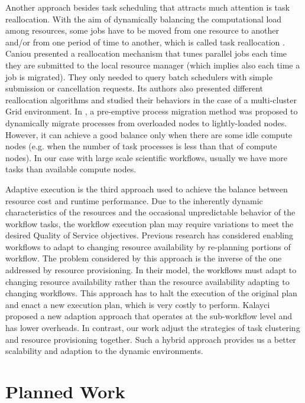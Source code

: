 Another approach besides task scheduling that attracts much attention is task reallocation. With the aim of dynamically balancing the computational load among resources, some jobs have to be moved from one resource to another and/or from one period of time to another, which is called task reallocation \cite{Tomas2012}. Caniou  \cite{Caniou2011} presented a reallocation mechanism that tunes parallel jobs each time they are submitted to the local resource manager (which implies also each time a job is migrated). They only needed to query batch schedulers with simple submission or cancellation requests.  Its authors also presented different reallocation algorithms and studied their behaviors in the case of a multi-cluster Grid environment. In \cite{Zhang2000}, a pre-emptive process migration method was proposed to dynamically migrate processes from overloaded nodes to lightly-loaded nodes. However, it can achieve a good balance only when there are some idle compute nodes (e.g. when the number of task processes is less than that of compute nodes). In our case with large scale scientific workflows, usually we have more tasks than available compute nodes. 

Adaptive execution is the third approach used to achieve the balance between resource cost and runtime performance. Due to the inherently dynamic characteristics of the resources and the occasional unpredictable behavior of the workflow tasks, the workflow execution plan may require variations to meet the desired Quality of Service objectives. Previous research \cite{Lee2008, Sakellariou2004, Yu2007} has considered enabling workflows to adapt to changing resource availability by re-planning portions of workflow. The problem considered by this approach is the inverse of the one addressed by resource provisioning. In their model, the workflows must adapt to changing resource availability rather than the resource availability adapting to changing workflows. This approach has to halt the execution of the original plan and enact a new execution plan, which is very costly to perform. Kalayci \cite{Kalayci2010} proposed a new adaption approach  that operates at the sub-workflow level and has lower overheads. In contrast, our work adjust the strategies of task clustering and resource provisioning together. Such a hybrid approach provides us a better scalability and adaption to the dynamic environments. 

\section{Planned Work}

